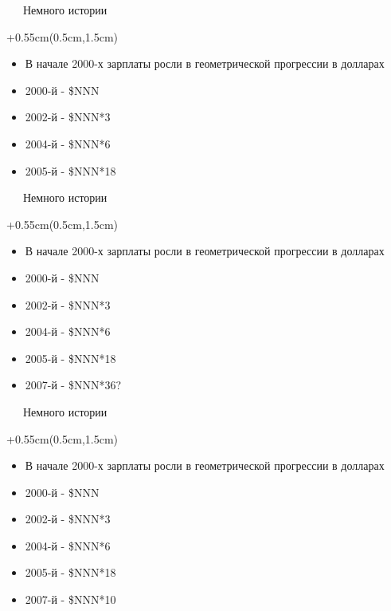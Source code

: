 \documentclass[xetex,18pt,aspectratio=169]{beamer}
\begin{document}
\begin{Large}
\begin{frame}{\ \ \ Немного истории}
\begin{textblock*}{\framewidth+0.55cm}(0.5cm,1.5cm)
\begin{itemize}
  \item В начале 2000-х зарплаты росли в геометрической прогрессии в долларах
  \item 2000-й - \$NNN
  \item 2002-й - \$NNN*3
  \item 2004-й - \$NNN*6
  \item 2005-й - \$NNN*18
\end{itemize}
\end{textblock*}
\end{frame}

\begin{frame}{\ \ \ Немного истории}
\begin{textblock*}{\framewidth+0.55cm}(0.5cm,1.5cm)
\begin{itemize}
  \item В начале 2000-х зарплаты росли в геометрической прогрессии в долларах
  \item 2000-й - \$NNN
  \item 2002-й - \$NNN*3
  \item 2004-й - \$NNN*6
  \item 2005-й - \$NNN*18
  \item 2007-й - \$NNN*36?
\end{itemize}
\end{textblock*}
\end{frame}

\begin{frame}{\ \ \ Немного истории}
\begin{textblock*}{\framewidth+0.55cm}(0.5cm,1.5cm)
\begin{itemize}
  \item В начале 2000-х зарплаты росли в геометрической прогрессии в долларах
  \item 2000-й - \$NNN
  \item 2002-й - \$NNN*3
  \item 2004-й - \$NNN*6
  \item 2005-й - \$NNN*18
  \item 2007-й - \$NNN*10
\end{itemize}
\end{textblock*}
\end{frame}


\end{Large}
\end{document}

